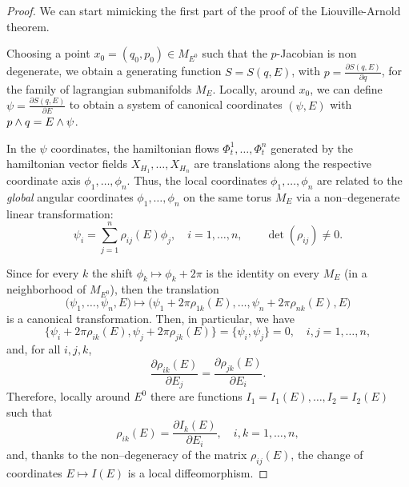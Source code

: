 \documentclass[english,fontsize=11pt,paper=a5,oneside]{scrbook}
\let\d\relax
\newcommand{\d}{\mathrm{d}}
\theoremstyle{definition}
\begin{document}
\begin{proof}
  We can start mimicking the first part of the proof of the Liouville-Arnold theorem. %

  Choosing a point $x_0 = (q_0, p_0) \in M_{E^0}$ such that the $p$-Jacobian is non degenerate, we obtain a generating function $S=S(q,E)$, with $p = \frac{\partial S(q,E)}{\partial q}$, for the family of lagrangian submanifolds $M_E$.
  Locally, around $x_0$, we can define $\psi = \frac{\partial S(q,E)}{\partial E}$ to obtain a system of canonical coordinates $(\psi, E)$ with $\d p\wedge\d q = \d E\wedge \d \psi$.

  In the $\psi$ coordinates, the hamiltonian flows $\Phi_t^1, \ldots, \Phi_t^n$ generated by the hamiltonian vector fields $X_{H_1}, \ldots, X_{H_n}$ are translations along the respective coordinate axis $\phi_1, \ldots, \phi_n$.
  Thus, the local coordinates $\phi_1, \ldots, \phi_n$ are related to the \emph{global} angular coordinates $\phi_1, \ldots, \phi_n$ on the same torus $M_E$ via a non--degenerate linear transformation:
  \begin{equation}
    \psi_i = \sum_{j=1}^n \rho_{ij}(E)\phi_j, \quad i=1,\ldots,n, \qquad \det(\rho_{ij})\neq 0.
  \end{equation}

  Since for every $k$ the shift $\phi_k \mapsto \phi_k + 2\pi$ is the identity on every $M_E$ (in a neighborhood of $M_{E^0}$), then the translation
  \begin{equation}
    \big(\psi_1, \ldots, \psi_n, E\big) \mapsto \big(\psi_1 + 2\pi \rho_{1k}(E), \ldots, \psi_n + 2\pi \rho_{nk}(E), E\big)
  \end{equation}
  is a canonical transformation.
  Then, in particular, we have
  \begin{equation}
    \big\{
    \psi_i + 2\pi \rho_{ik}(E), \psi_j + 2\pi \rho_{jk}(E)
    \big\} = \big\{\psi_i, \psi_j\big\} = 0, \quad i,j = 1, \ldots, n,
  \end{equation}
  and, for all $i,j,k$,
  \begin{equation}
    \frac{\partial \rho_{ik}(E)}{\partial E_j}
    = \frac{\partial \rho_{jk}(E)}{\partial E_i}.
  \end{equation}
  Therefore, locally around $E^0$ there are functions $I_1 = I_1(E), \ldots, I_2 = I_2(E)$ such that
  \begin{equation}
    \rho_{ik}(E) = \frac{\partial I_k(E)}{\partial E_i}, \quad i,k=1,\ldots,n,
  \end{equation}
  and, thanks to the non--degeneracy of the matrix $\rho_{ij}(E)$, the change of coordinates $E \mapsto I(E)$ is a local diffeomorphism.


\end{proof}
\end{document}
